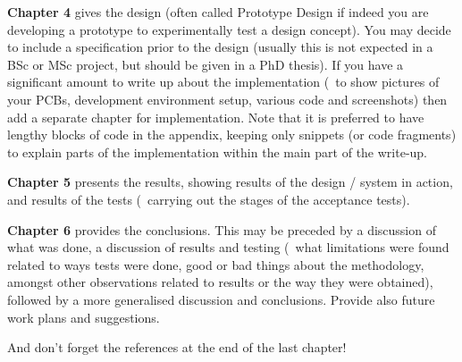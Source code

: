 \textbf{Chapter 4} gives the design (often called Prototype Design if indeed you are developing a prototype to experimentally test a design concept). You may decide to include a specification prior to the design (usually this is not expected in a BSc or MSc project, but should be given in a PhD thesis).  If you have a significant amount to write up about the implementation (\ie~to show pictures of your PCBs, development environment setup, various code and screenshots) then add a separate chapter for implementation. Note that it is preferred to have lengthy blocks of code in the appendix, keeping only snippets (or code fragments) to explain parts of the implementation within the main part of the write-up.

\textbf{Chapter 5} presents the results, showing results of the design / system in action, and results of the tests (\ie~carrying out the stages of the acceptance tests).

\textbf{Chapter 6} provides the conclusions. This may be preceded by a discussion of what was done, a discussion of results and testing (\eg~what limitations were found related to ways tests were done, good or bad things about the methodology, amongst other observations related to results or the way they were obtained), followed by a more generalised discussion and conclusions. Provide also future work plans and suggestions.

And don't forget the references at the end of the last chapter!
